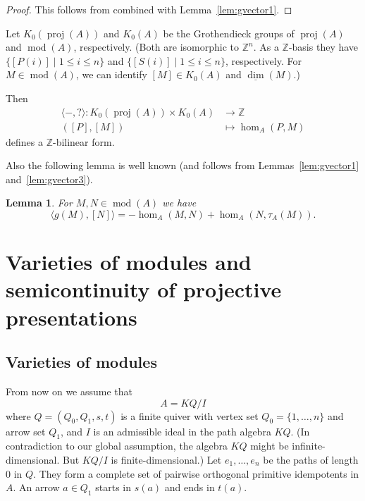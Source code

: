\documentclass[12pt,reqno]{amsart}
\newtheorem{Lem}[Thm]{Lemma}
\theoremstyle{definition}
\newcommand{\Z}{\mathbb{Z}}
\newcommand{\df}{\colon}
\newcommand{\md}{\operatorname{mod}}
\newcommand{\dimv}{\underline{\dim}}
\newcommand{\proj}{\operatorname{proj}}
\newcommand{\bil}[1]{\langle #1\rangle}
\begin{document}
\begin{proof}
This follows from \cite[Section~IV.4]{ARS97}
combined with
Lemma~\ref{lem:gvector1}.
\end{proof}

Let $K_0(\proj(A))$ and $K_0(A)$ be the Grothendieck groups of
$\proj(A)$ and $\md(A)$, respectively.
(Both are isomorphic to $\Z^n$.
As a $\Z$-basis they have $\{ [P(i)] \mid 1 \le i \le n \}$ and
$\{ [S(i)] \mid 1 \le i \le n \}$, respectively.
For $M \in \md(A)$, we can identify $[M] \in K_0(A)$ and $\dimv(M)$.)

Then
\begin{align*}
\bil{-,?}\df K_0(\proj(A)) \times K_0(A) &\to \Z
\\
([P],[M]) &\mapsto \hom_A(P,M)
\end{align*}
defines a $\Z$-bilinear form.

Also the following lemma is well known (and follows from Lemmas~\ref{lem:gvector1} and~\ref{lem:gvector3}).

\begin{Lem}\label{lem:bilinear}
For $M,N \in \md(A)$ we have
$$
\bil{g(M),[N]} = - \hom_A(M,N) + \hom_A(N,\tau_A(M)).
$$
\end{Lem}



\section{Varieties of modules and semicontinuity of projective presentations}\label{sec:varieties}


\subsection{Varieties of modules}
From now on we assume
that
$$
A = KQ/I
$$
where $Q = (Q_0,Q_1,s,t)$
is a finite quiver with vertex set $Q_0 = \{ 1,\ldots,n \}$
and arrow set $Q_1$,
and $I$ is an admissible ideal in the path algebra
$KQ$.
(In contradiction to our global assumption, the algebra $KQ$ might be infinite-dimensional. But $KQ/I$ is finite-dimensional.)
Let $e_1,\ldots,e_n$ be the paths of length $0$ in $Q$.
They form a complete set of pairwise orthogonal primitive
idempotents in $A$.
An arrow $a \in Q_1$ starts in $s(a)$ and ends in $t(a)$.
\end{document}
